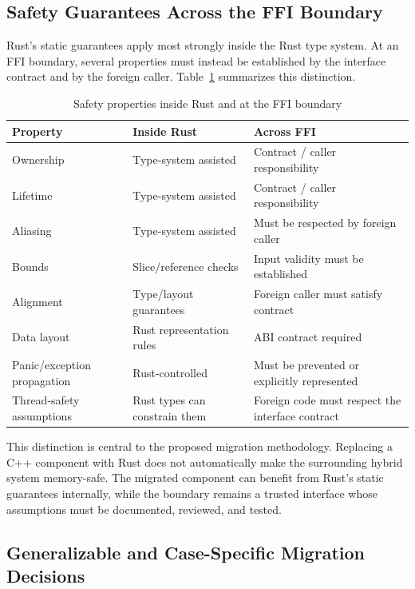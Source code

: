 \subsection{Safety Guarantees Across the FFI Boundary}
\label{sec:ffi_safety_analysis}

Rust's static guarantees apply most strongly inside the Rust type system. At an FFI boundary, several properties must instead be established by the interface contract and by the foreign caller. Table~\ref{tab:ffi_safety_boundary} summarizes this distinction.

\begin{table}[H]
\centering
\renewcommand{\arraystretch}{1.2}
{\small
\begin{tabularx}{\textwidth}{|X|X|X|}
\hline
\textbf{Property} & \textbf{Inside Rust} & \textbf{Across FFI} \\ \hline
Ownership & Type-system assisted & Contract / caller responsibility \\ \hline
Lifetime & Type-system assisted & Contract / caller responsibility \\ \hline
Aliasing & Type-system assisted & Must be respected by foreign caller \\ \hline
Bounds & Slice/reference checks & Input validity must be established \\ \hline
Alignment & Type/layout guarantees & Foreign caller must satisfy contract \\ \hline
Data layout & Rust representation rules & ABI contract required \\ \hline
Panic/exception propagation & Rust-controlled & Must be prevented or explicitly represented \\ \hline
Thread-safety assumptions & Rust types can constrain them & Foreign code must respect the interface contract \\ \hline
\end{tabularx}
}
\caption{Safety properties inside Rust and at the FFI boundary}
\label{tab:ffi_safety_boundary}
\end{table}

This distinction is central to the proposed migration methodology. Replacing a C++ component with Rust does not automatically make the surrounding hybrid system memory-safe. The migrated component can benefit from Rust's static guarantees internally, while the boundary remains a trusted interface whose assumptions must be documented, reviewed, and tested.

\subsection{Generalizable and Case-Specific Migration Decisions}
\label{sec:generalizable_patterns}

